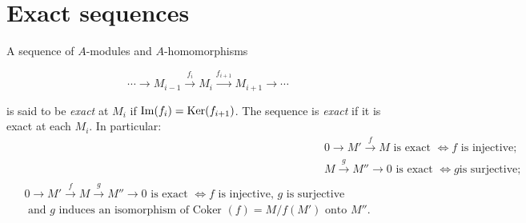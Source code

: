 \documentclass{standalone}
\theoremstyle{definition}
\theoremstyle{remark}
\begin{document}
\section{Exact sequences}
A sequence of $A$-modules and $A$-homomorphisms

\[
  \cdots \longrightarrow M_{i-1} \stackrel{f_{i}}{\longrightarrow}
  M_{i} \stackrel{f_{i+1}}{\longrightarrow} M_{i+1} \longrightarrow
  \cdots\tag{0}\label{es0}
\]

is said to be {\itshape exact} at $M_{i}$ if
$\operatorname{Im}(f_{i})=\operatorname{Ker}(f_{i+1})$. The sequence is {\itshape exact} if it
is exact at each $M_{i}$. In particular:
\begin{align}
&0 \to M' \stackrel{f}{\to} M\text{ is exact }\Leftrightarrow f\text{ is injective;}\tag{1}  \label{es1}\\
&M \stackrel{g}{\to} M'' \to 0\text{ is exact }\Leftrightarrow g\text{
  is surjective;}\tag{2}\label{es2}\\
    \begin{split}
      &0 \to M' \stackrel{f}{\to} M \stackrel{g}{\to} M'' \to 0\text{ is exact
    $\Leftrightarrow f$ is injective, $g$ is surjective}\\&\text{ and $g$ induces an
    isomorphism of Coker $(f)=M / f(M')$ onto $M''$.}
  \end{split}\tag{3}\label{es3}
\end{align}
\end{document}
